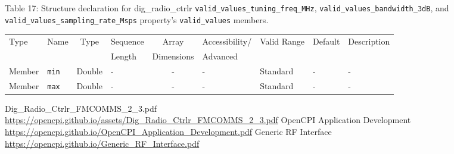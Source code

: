 \documentclass{article}
\def\comp{dig\_radio\_ctrlr}
\begin{document}
\begin{landscape}
	\noindent Table \hypertarget{tab17}{17}: Structure declaration for \comp{} \verb+valid_values_tuning_freq_MHz+, \verb+valid_values_bandwidth_3dB+, and \verb+valid_values_sampling_rate_Msps+ property's \verb+valid_values+ members.
	\begin{scriptsize}
		\noindent\begin{longtable}{|p{1.8cm}|p{3.6cm}|c|p{4cm}|c|p{2cm}|p{1.7cm}|p{0.8cm}|p{4.69cm}|}
			\hline
			\rowcolor{blue}
			Type         & Name                                & Type & Sequence & Array      & Accessibility/ & Valid Range  & Default & Description                                                                                                                                                                                                                       \\
			\rowcolor{blue}
			             &                                     &      & Length   & Dimensions & Advanced       &              &         &                                                                                                                                                                                                                             \\
			\hline
			Member       & \verb+min+                          & Double & -       & -          & -              & Standard     & -       & - \\
			\hline
			Member       & \verb+max+                          & Double & -       & -          & -              & Standard     & -       & - \\
			\hline
		\end{longtable}
	\end{scriptsize}

\end{landscape}

\begin{thebibliography}{1}

   Dig\_Radio\_Ctrlr\_FMCOMMS\_2\_3.pdf \\
  \url{https://opencpi.github.io/assets/Dig_Radio_Ctrlr_FMCOMMS_2_3.pdf}
   OpenCPI Application Development \\
  \url{https://opencpi.github.io/OpenCPI_Application_Development.pdf}
   Generic RF Interface \\
  \url{https://opencpi.github.io/Generic_RF_Interface.pdf}

\end{thebibliography}
\end{document}
